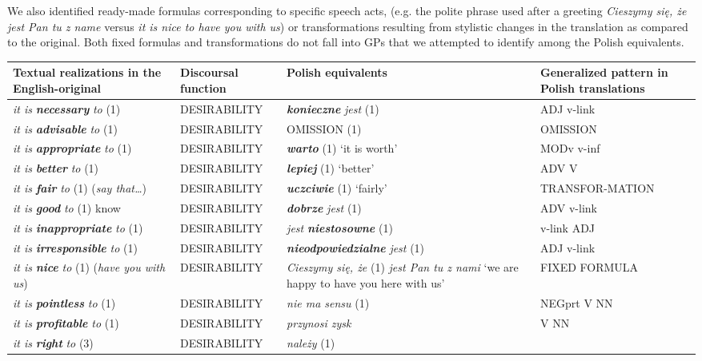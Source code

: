 \documentclass[12pt]{article}
\newenvironment{styleStandard}{\setlength\leftskip{0cm}\setlength\rightskip{0cm plus 1fil}\setlength\parindent{0cm}\setlength\parfillskip{0pt plus 1fil}\setlength\parskip{0in plus 1pt}\writerlistparindent\writerlistleftskip\leavevmode\normalfont\normalsize\writerlistlabel\ignorespaces}{\unskip\vspace{0.111in plus 0.0111in}\par}
\newcommand\writerlistleftskip{}
\newcommand\writerlistparindent{}
\newcommand\writerlistlabel{}
\begin{document}
\begin{styleStandard}
We also identified ready-made formulas corresponding to specific speech acts, (e.g. the polite phrase used after a greeting \textit{Cieszymy się, że jest Pan tu z name }versus \textit{it is nice to have you with us}) or transformations resulting from stylistic changes in the translation as compared to the original. Both fixed formulas and transformations do not fall into GPs that we attempted to identify among the Polish equivalents.
\end{styleStandard}

\begin{flushleft}
\tablefirsthead{}
\tablehead{}
\tabletail{}
\tablelasttail{}
\begin{supertabular}{|m{1.2761599in}|m{1.1018599in}|m{1.3976599in}|m{0.8073598in}|}
\hline
\textbf{Textual realizations in the English-original} &
\textbf{Discoursal function} &
\textbf{Polish equivalents} &
\textbf{Generalized pattern in Polish translations }\\\hline
\textit{it is }\textbf{\textit{necessary}}\textit{ to} (1) &
DESIRABILITY &
\textbf{\textit{konieczne}}\textit{ jest} (1) &
ADJ v-link\\\hline
\textit{it is }\textbf{\textit{advisable}}\textit{ to} (1)  &
DESIRABILITY &
OMISSION\footnotemark{} (1) &
OMISSION\\\hline
\textit{it is }\textbf{\textit{appropriate}}\textit{ to} (1) &
DESIRABILITY &
\textbf{\textit{warto}} (1) ‘it is worth’ &
MODv v-inf\\\hline
\textit{it is }\textbf{\textit{better}}\textit{ to} (1) &
DESIRABILITY &
\textbf{\textit{lepiej}} (1) ‘better’ &
ADV V\\\hline
\textit{it is }\textbf{\textit{fair}}\textit{ to} (1) (\textit{say that…}) &
DESIRABILITY &
\textbf{\textit{uczciwie}}\textbf{ }(1) ‘fairly’ &
TRANSFOR-MATION\footnotemark{}\\\hline
\textit{it is }\textbf{\textit{good}}\textit{ to }(1)\textit{ }know &
DESIRABILITY &
\textbf{\textit{dobrze}}\textit{ jest} (1)  &
ADV v-link\\\hline
\textit{it is }\textbf{\textit{inappropriate}}\textit{ to} (1) &
DESIRABILITY &
\textit{jest }\textbf{\textit{niestosowne}} (1) &
v-link ADJ\\\hline
\textit{it is }\textbf{\textit{irresponsible}}\textit{ to} (1) &
DESIRABILITY &
\textbf{\textit{nieodpowiedzialne}}\textit{ jest} (1) &
ADJ v-link\\\hline
\textit{it is }\textbf{\textit{nice}}\textit{ to} (1) (\textit{have you with us}) &
DESIRABILITY &
\textit{Cieszymy się, że} (1) \textit{jest Pan tu z nami} ‘we are happy to have you here with us’ &
FIXED FORMULA\\\hline
\textit{it is }\textbf{\textit{pointless}}\textit{ to} (1) &
DESIRABILITY &
\textit{nie ma sensu} (1)  &
NEGprt V NN\\\hline
\textit{it is }\textbf{\textit{profitable}}\textit{ to} (1)  &
DESIRABILITY &
\textit{przynosi zysk } &
V NN\\\hline
\textit{it is }\textbf{\textit{right}}\textit{ to} (3)  &
DESIRABILITY &
\textit{należy} (1) 


\end{supertabular}
\end{flushleft}
\end{document}
